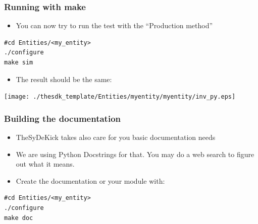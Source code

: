 \documentclass[logo=bluequo,normaltitle]{aaltoslides}
\begin{document}
\nextlines[45]
\begin{frame}[t,fragile]
    \frametitle{Running with make } 
    \begin{itemize}
        \item You can now try to run the test with the ``Production method''
    \end{itemize}
\begin{lstlisting}
#cd Entities/<my_entity>
./configure
make sim
\end{lstlisting}
    \begin{itemize}
        \item The result should be the same:
    \end{itemize}
    \begin{center}
        \texttt{[image: ./thesdk\_template/Entities/myentity/myentity/inv\_py.eps]}
    \end{center}
\end{frame}


\begin{frame}[t,fragile]
    \frametitle{Building the documentation} 
    \begin{itemize}
        \item TheSyDeKick takes also care for you basic documentation needs
        \item We are using Python Docstrings for that. You may do a web search
            to figure out what it means.
        \item Create the documentation or your module with:

    \end{itemize}
\begin{lstlisting}
#cd Entities/<my_entity>
./configure
make doc
\end{lstlisting}
\end{frame}
\end{document}
